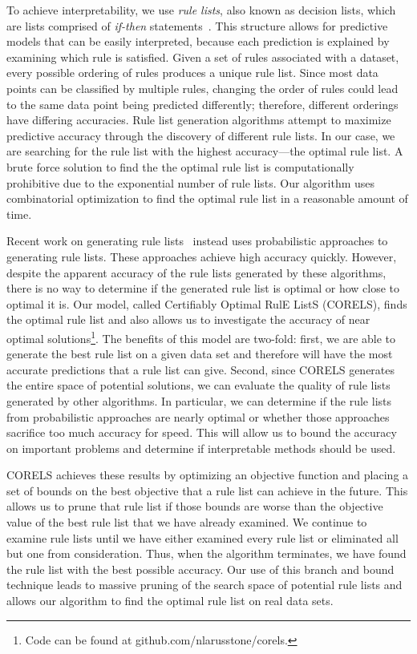To achieve interpretability, we use \emph{rule lists}, also known as decision lists, which are lists comprised of \emph{if-then} statements~\cite{Rivest87}. 
This structure allows for predictive models that can be easily interpreted, because each prediction is explained by examining which rule is satisfied. 
Given a set of rules associated with a dataset, every possible ordering of rules produces a unique rule list.
Since most data points can be classified by multiple rules, changing the order of rules could lead to the same data point being predicted differently; therefore, different orderings have differing accuracies. 
Rule list generation algorithms attempt to maximize predictive accuracy through the discovery of different rule lists.
In our case, we are searching for the rule list with the highest accuracy---the optimal rule list. 
A brute force solution to find the the optimal rule list is computationally prohibitive due to the exponential number of rule lists.
Our algorithm uses combinatorial optimization to find the optimal rule list in a reasonable amount of time.

Recent work on generating rule lists~\cite{LethamRuMcMa15,YangRuSe16} instead uses probabilistic approaches to generating rule lists.
These approaches achieve high accuracy quickly.
However, despite the apparent accuracy of the rule lists generated by these algorithms, there is no way to determine if the generated rule list is optimal or how close to optimal it is. 
Our model, called Certifiably Optimal RulE ListS (CORELS), finds the optimal rule list and also allows us to investigate the accuracy of near optimal solutions\footnote{\label{footnote:code} Code can be found at github.com/nlarusstone/corels.}.
The benefits of this model are two-fold: first, we are able to generate the best rule list on a given data set and therefore will have the most accurate predictions that a rule list can give.
Second, since CORELS generates the entire space of potential solutions, we can evaluate the quality of rule lists generated by other algorithms. 
In particular, we can determine if the rule lists from probabilistic approaches are nearly optimal or whether those approaches sacrifice too much accuracy for speed.
This will allow us to bound the accuracy on important problems and determine if interpretable methods should be used.

CORELS achieves these results by optimizing an objective function and placing a set of bounds on the best objective that a rule list can achieve in the future. 
This allows us to prune that rule list if those bounds are worse than the objective value of the best rule list that we have already examined.
We continue to examine rule lists until we have either examined every rule list or eliminated all but one from consideration. 
Thus, when the algorithm terminates, we have found the rule list with the best possible accuracy. 
Our use of this branch and bound technique leads to massive pruning of the search space of potential rule lists and allows our algorithm to find the optimal rule list on real data sets.

